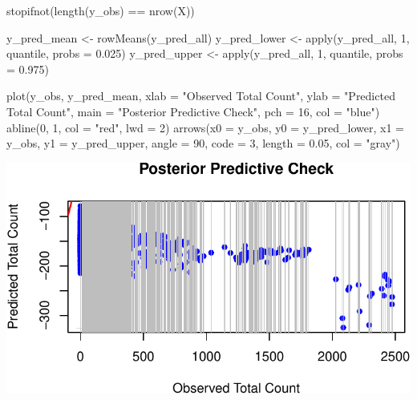 \documentclass[
  12pt,
]{article}
\newenvironment{Shaded}{\begin{snugshade}}{\end{snugshade}}
\newcommand{\AttributeTok}[1]{\textcolor[rgb]{0.40,0.45,0.13}{#1}}
\newcommand{\DecValTok}[1]{\textcolor[rgb]{0.68,0.00,0.00}{#1}}
\newcommand{\FloatTok}[1]{\textcolor[rgb]{0.68,0.00,0.00}{#1}}
\newcommand{\FunctionTok}[1]{\textcolor[rgb]{0.28,0.35,0.67}{#1}}
\newcommand{\NormalTok}[1]{\textcolor[rgb]{0.00,0.23,0.31}{#1}}
\newcommand{\OtherTok}[1]{\textcolor[rgb]{0.00,0.23,0.31}{#1}}
\newcommand{\SpecialCharTok}[1]{\textcolor[rgb]{0.37,0.37,0.37}{#1}}
\newcommand{\StringTok}[1]{\textcolor[rgb]{0.13,0.47,0.30}{#1}}
\begin{document}
\begin{Shaded}
\begin{Highlighting}[]
\FunctionTok{stopifnot}\NormalTok{(}\FunctionTok{length}\NormalTok{(y\_obs) }\SpecialCharTok{==} \FunctionTok{nrow}\NormalTok{(X))}

\NormalTok{y\_pred\_mean }\OtherTok{\textless{}{-}} \FunctionTok{rowMeans}\NormalTok{(y\_pred\_all)}
\NormalTok{y\_pred\_lower }\OtherTok{\textless{}{-}} \FunctionTok{apply}\NormalTok{(y\_pred\_all, }\DecValTok{1}\NormalTok{, quantile, }\AttributeTok{probs =} \FloatTok{0.025}\NormalTok{)}
\NormalTok{y\_pred\_upper }\OtherTok{\textless{}{-}} \FunctionTok{apply}\NormalTok{(y\_pred\_all, }\DecValTok{1}\NormalTok{, quantile, }\AttributeTok{probs =} \FloatTok{0.975}\NormalTok{)}

\FunctionTok{plot}\NormalTok{(y\_obs, y\_pred\_mean,}
     \AttributeTok{xlab =} \StringTok{"Observed Total Count"}\NormalTok{,}
     \AttributeTok{ylab =} \StringTok{"Predicted Total Count"}\NormalTok{,}
     \AttributeTok{main =} \StringTok{"Posterior Predictive Check"}\NormalTok{,}
     \AttributeTok{pch =} \DecValTok{16}\NormalTok{, }\AttributeTok{col =} \StringTok{"blue"}\NormalTok{)}
\FunctionTok{abline}\NormalTok{(}\DecValTok{0}\NormalTok{, }\DecValTok{1}\NormalTok{, }\AttributeTok{col =} \StringTok{"red"}\NormalTok{, }\AttributeTok{lwd =} \DecValTok{2}\NormalTok{)}
\FunctionTok{arrows}\NormalTok{(}\AttributeTok{x0 =}\NormalTok{ y\_obs, }\AttributeTok{y0 =}\NormalTok{ y\_pred\_lower, }\AttributeTok{x1 =}\NormalTok{ y\_obs, }\AttributeTok{y1 =}\NormalTok{ y\_pred\_upper, }
       \AttributeTok{angle =} \DecValTok{90}\NormalTok{, }\AttributeTok{code =} \DecValTok{3}\NormalTok{, }\AttributeTok{length =} \FloatTok{0.05}\NormalTok{, }\AttributeTok{col =} \StringTok{"gray"}\NormalTok{)}
\end{Highlighting}
\end{Shaded}

\includegraphics{final_main_quarto_presentation_files/figure-pdf/unnamed-chunk-25-1.pdf}
\end{document}
